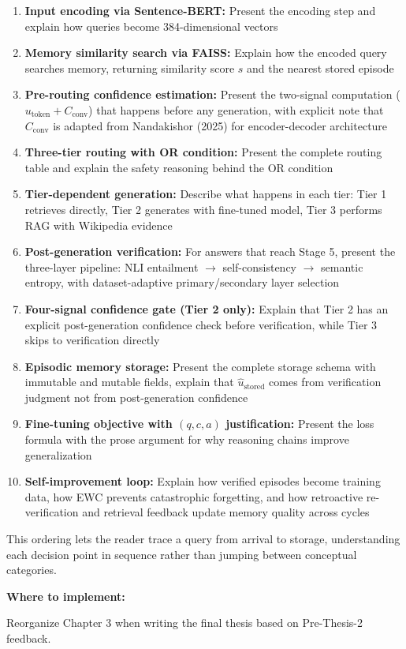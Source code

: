 \documentclass[11pt,a4paper]{article}
\newcommand{\Cconv}{C_{\text{conv}}}
\newcommand{\ustored}{\hat{u}_{\text{stored}}}
\begin{document}
{\begin{enumerate}
\item \textbf{Input encoding via Sentence-BERT:} Present the encoding step and explain how queries become 384-dimensional vectors
\item \textbf{Memory similarity search via FAISS:} Explain how the encoded query searches memory, returning similarity score $s$ and the nearest stored episode
\item \textbf{Pre-routing confidence estimation:} Present the two-signal computation ($u_{\text{token}} + \Cconv$) that happens before any generation, with explicit note that $\Cconv$ is adapted from Nandakishor (2025) for encoder-decoder architecture
\item \textbf{Three-tier routing with OR condition:} Present the complete routing table and explain the safety reasoning behind the OR condition
\item \textbf{Tier-dependent generation:} Describe what happens in each tier: Tier 1 retrieves directly, Tier 2 generates with fine-tuned model, Tier 3 performs RAG with Wikipedia evidence
\item \textbf{Post-generation verification:} For answers that reach Stage 5, present the three-layer pipeline: NLI entailment $\to$ self-consistency $\to$ semantic entropy, with dataset-adaptive primary/secondary layer selection
\item \textbf{Four-signal confidence gate (Tier 2 only):} Explain that Tier 2 has an explicit post-generation confidence check before verification, while Tier 3 skips to verification directly
\item \textbf{Episodic memory storage:} Present the complete storage schema with immutable and mutable fields, explain that $\ustored$ comes from verification judgment not from post-generation confidence
\item \textbf{Fine-tuning objective with $(q,c,a)$ justification:} Present the loss formula with the prose argument for why reasoning chains improve generalization
\item \textbf{Self-improvement loop:} Explain how verified episodes become training data, how EWC prevents catastrophic forgetting, and how retroactive re-verification and retrieval feedback update memory quality across cycles
\end{enumerate}

This ordering lets the reader trace a query from arrival to storage, understanding each decision point in sequence rather than jumping between conceptual categories.

\textbf{Where to implement:}

Reorganize Chapter 3 when writing the final thesis based on Pre-Thesis-2 feedback.
}
\end{document}
